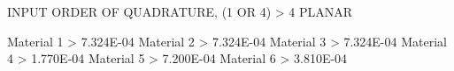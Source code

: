 INPUT ORDER OF QUADRATURE, (1 OR 4) > 4 PLANAR

  Material  1 > 7.324E-04 
  Material  2 > 7.324E-04 
  Material  3 > 7.324E-04 
  Material  4 > 1.770E-04 
  Material  5 > 7.200E-04 
  Material  6 > 3.810E-04 
